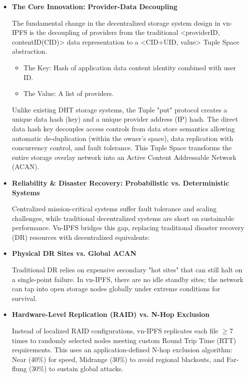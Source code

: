 \documentclass[conference]{IEEEtran}
\begin{document}
\begin{itemize}
\item \textbf{The Core Innovation: Provider-Data Decoupling}

The fundamental change in the decentralized storage system design in vn-IPFS is the decoupling of providers from the traditional \textless{}providerID, contentID(CID)\textgreater{} data representation to a \textless{}CID+UID, value\textgreater{} Tuple Space abstraction.
    \begin{itemize}
        \item The Key: Hash of application data content identity combined with user ID.
        \item The Value: A list of providers.
    \end{itemize}
Unlike existing DHT storage systems, the Tuple "put" protocol creates a unique data hash (key) and a unique provider address (IP) hash. The direct data hash key decouples access controls from data store semantics allowing automatic de-duplication (within the owner’s space), data replication with concurrency control, and fault tolerance. This Tuple Space transforms the entire storage overlay network into an Active Content Addressable Network (ACAN).

\item \textbf{Reliability \& Disaster Recovery: Probabilistic vs. Deterministic Systems}

Centralized mission-critical systems suffer fault tolerance and scaling challenges, while traditional decentralized systems are short on sustainable performance. Vn-IPFS bridges this gap, replacing traditional disaster recovery (DR) resources with decentralized equivalents:

\item \textbf{Physical DR Sites vs. Global ACAN}

Traditional DR relies on expensive secondary "hot sites" that can still halt on a single-point failure. In vn-IPFS, there are no idle standby sites; the network can tap into open storage nodes globally under extreme conditions for survival.

\item \textbf{Hardware-Level Replication (RAID) vs. N-Hop Exclusion}

Instead of localized RAID configurations, vn-IPFS replicates each file $\ge 7$ times to randomly selected nodes meeting custom Round Trip Time (RTT) requirements. This uses an application-defined N-hop exclusion algorithm: Near (40\%) for speed, Midrange (30\%) to avoid regional blackouts, and Far-flung (30\%) to sustain global attacks.


\end{itemize}
\end{document}
